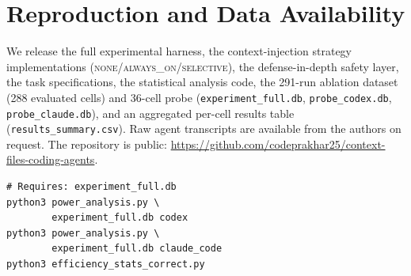 \documentclass[11pt]{article}
\newcommand{\none}{\textsc{none}}
\newcommand{\alwayson}{\textsc{always\_on}}
\newcommand{\selective}{\textsc{selective}}
\begin{document}
\section{Reproduction and Data Availability}
\label{app:reproduce}

We release the full experimental harness, the context-injection strategy
implementations (\none{}/\alwayson{}/\selective{}), the defense-in-depth safety
layer, the task specifications, the statistical analysis code, the 291-run
ablation dataset (288 evaluated cells) and 36-cell probe (\texttt{experiment\_full.db},
\texttt{probe\_codex.db}, \texttt{probe\_claude.db}), and an aggregated per-cell
results table (\texttt{results\_summary.csv}).
Raw agent transcripts are available from the authors on request.
The repository is public: \url{https://github.com/codeprakhar25/context-files-coding-agents}.

{\footnotesize
\begin{verbatim}
# Requires: experiment_full.db
python3 power_analysis.py \
        experiment_full.db codex
python3 power_analysis.py \
        experiment_full.db claude_code
python3 efficiency_stats_correct.py
\end{verbatim}
}
\end{document}
